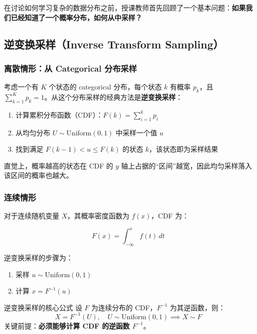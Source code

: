 \documentclass[a4paper]{article}
\begin{document}
在讨论如何学习复杂的数据分布之前，授课教师首先回顾了一个基本问题：\textbf{如果我们已经知道了一个概率分布，如何从中采样？}

\subsection{逆变换采样（Inverse Transform Sampling）}

\subsubsection{离散情形：从 Categorical 分布采样}

考虑一个有 $K$ 个状态的 categorical 分布，每个状态 $k$ 有概率 $p_k$，且 $\sum_{k=1}^K p_k = 1$。从这个分布采样的经典方法是\textbf{逆变换采样}：

\begin{enumerate}
    \item 计算累积分布函数（CDF）：$F(k) = \sum_{i=1}^{k} p_i$
    \item 从均匀分布 $U \sim \text{Uniform}(0, 1)$ 中采样一个值 $u$
    \item 找到满足 $F(k-1) < u \leq F(k)$ 的状态 $k$，该状态即为采样结果
\end{enumerate}

直觉上，概率越高的状态在 CDF 的 $y$ 轴上占据的``区间''越宽，因此均匀采样落入该区间的概率也越大。

\subsubsection{连续情形}

对于连续随机变量 $X$，其概率密度函数为 $f(x)$，CDF 为：

$$F(x) = \int_{-\infty}^{x} f(t) \, dt$$

逆变换采样的步骤为：

\begin{enumerate}
    \item 采样 $u \sim \text{Uniform}(0, 1)$
    \item 计算 $x = F^{-1}(u)$
\end{enumerate}

\begin{importantbox}{逆变换采样的核心公式}
设 $F$ 为连续分布的 CDF，$F^{-1}$ 为其逆函数，则：
$$X = F^{-1}(U), \quad U \sim \text{Uniform}(0,1) \implies X \sim F$$
关键前提：\textbf{必须能够计算 CDF 的逆函数 $F^{-1}$}。
\end{importantbox}
\end{document}

